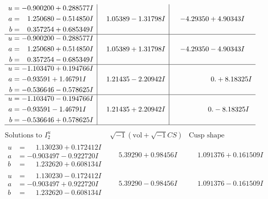 \documentclass[1p]{elsarticle_modified}
\theoremstyle{definition}
\newcommand{\I}{\sqrt{-1}}
\begin{document}
$$\begin{array}{c|c|c}
\begin{aligned}
u &= -0.900200 + 0.288577 I \\
a &= \phantom{-}1.250680 - 0.514850 I \\
b &= \phantom{-}0.357254 + 0.685349 I\end{aligned}
 & \phantom{-}1.05389 - 1.31798 I & -4.29350 + 4.90343 I \\ \hline\begin{aligned}
u &= -0.900200 - 0.288577 I \\
a &= \phantom{-}1.250680 + 0.514850 I \\
b &= \phantom{-}0.357254 - 0.685349 I\end{aligned}
 & \phantom{-}1.05389 + 1.31798 I & -4.29350 - 4.90343 I \\ \hline\begin{aligned}
u &= -1.103470 + 0.194766 I \\
a &= -0.93591 + 1.46791 I \\
b &= -0.536646 - 0.578625 I\end{aligned}
 & \phantom{-}1.21435 - 2.20942 I & \phantom{-0.000000 -}0. + 8.18325 I \\ \hline\begin{aligned}
u &= -1.103470 - 0.194766 I \\
a &= -0.93591 - 1.46791 I \\
b &= -0.536646 + 0.578625 I\end{aligned}
 & \phantom{-}1.21435 + 2.20942 I & \phantom{-0.000000 } 0. - 8.18325 I\\
 \hline 
 \end{array}$$\newpage$$\begin{array}{c|c|c}  
\text{Solutions to }I^u_{2}& \I (\text{vol} + \sqrt{-1}CS) & \text{Cusp shape}\\
 \hline 
\begin{aligned}
u &= \phantom{-}1.130230 + 0.172412 I \\
a &= -0.903497 - 0.922720 I \\
b &= \phantom{-}1.232620 + 0.608134 I\end{aligned}
 & \phantom{-}5.39290 + 0.98456 I & \phantom{-}1.091376 + 0.161509 I \\ \hline\begin{aligned}
u &= \phantom{-}1.130230 - 0.172412 I \\
a &= -0.903497 + 0.922720 I \\
b &= \phantom{-}1.232620 - 0.608134 I\end{aligned}
 & \phantom{-}5.39290 - 0.98456 I & \phantom{-}1.091376 - 0.161509 I \\ \hline\begin{aligned}

\end{aligned}
\end{array}$$
\end{document}
